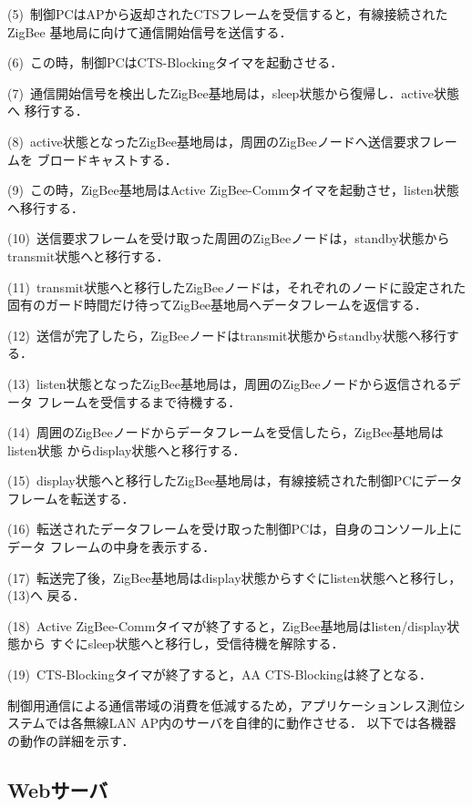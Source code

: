 \documentclass[technicalreport]{ieicej}
\begin{document}
\noindent
(5)~制御PCはAPから返却されたCTSフレームを受信すると，有線接続されたZigBee
基地局に向けて通信開始信号を送信する．

\noindent
(6)~この時，制御PCはCTS-Blockingタイマを起動させる．

\noindent
(7)~通信開始信号を検出したZigBee基地局は，sleep状態から復帰し．active状態へ
移行する．

\noindent
(8)~active状態となったZigBee基地局は，周囲のZigBeeノードへ送信要求フレームを
ブロードキャストする．

\noindent
(9)~この時，ZigBee基地局はActive ZigBee-Commタイマを起動させ，listen状態へ移行する．

\noindent
(10)~送信要求フレームを受け取った周囲のZigBeeノードは，standby状態から
transmit状態へと移行する．

\noindent
(11)~transmit状態へと移行したZigBeeノードは，それぞれのノードに設定された
固有のガード時間だけ待ってZigBee基地局へデータフレームを返信する．

\noindent
(12)~送信が完了したら，ZigBeeノードはtransmit状態からstandby状態へ移行する．

\noindent
(13)~listen状態となったZigBee基地局は，周囲のZigBeeノードから返信されるデータ
フレームを受信するまで待機する．

\noindent
(14)~周囲のZigBeeノードからデータフレームを受信したら，ZigBee基地局はlisten状態
からdisplay状態へと移行する．

\noindent
(15)~display状態へと移行したZigBee基地局は，有線接続された制御PCにデータ
フレームを転送する．

\noindent
(16)~転送されたデータフレームを受け取った制御PCは，自身のコンソール上にデータ
フレームの中身を表示する．

\noindent
(17)~転送完了後，ZigBee基地局はdisplay状態からすぐにlisten状態へと移行し，(13)へ
戻る．

\noindent
(18)~Active ZigBee-Commタイマが終了すると，ZigBee基地局はlisten/display状態から
すぐにsleep状態へと移行し，受信待機を解除する．

\noindent
(19)~CTS-Blockingタイマが終了すると，AA CTS-Blockingは終了となる．

制御用通信による通信帯域の消費を低減するため，アプリケーションレス測位シ
ステムでは各無線LAN AP内のサーバを自律的に動作させる．
以下では各機器の動作の詳細を示す．

\subsection{Webサーバ}
\label{ssec:design_web_server}
\end{document}
